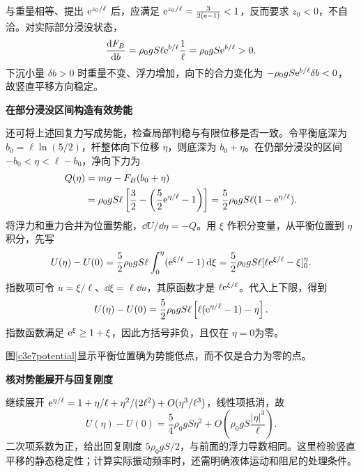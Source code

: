 \begin{solution}
与重量相等、提出 $\mathrm e^{z_0/\ell}$ 后，应满足
$\mathrm e^{z_0/\ell}=\tfrac{3}{2(\mathrm e-1)}<1$，反而要求 $z_0<0$，不自洽。对实际部分浸没状态，
\[
\frac{\mathop{}\!\mathrm d F_B}{\mathop{}\!\mathrm d b}
=\rho_0gS\ell\mathrm e^{b/\ell}\frac1\ell
=\rho_0gS\mathrm e^{b/\ell}>0.
\]
下沉小量 $\delta b>0$ 时重量不变、浮力增加，向下的合力变化为 $-\rho_0gS\mathrm e^{b/\ell}\delta b<0$，故竖直平移方向稳定。


\par\medskip{}\noindent\textbf{在部分浸没区间构造有效势能}\par\nobreak
还可将上述回复力写成势能，检查局部判稳与有限位移是否一致。令平衡底深为 $b_0=\ell\ln(5/2)$，杆整体向下位移 $\eta$，则底深为 $b_0+\eta$。在仍部分浸没的区间 $-b_0<\eta<\ell-b_0$，净向下力为
\begin{align*}
Q(\eta)&=mg-F_B(b_0+\eta)\\
 &=\rho_0gS\ell\left[\frac32-\left(\frac52\mathrm e^{\eta/\ell}-1\right)\right]
 =\frac52\rho_0gS\ell(1-\mathrm e^{\eta/\ell}).
\end{align*}
将浮力和重力合并为位置势能，$\dd U/\dd\eta=-Q$。用 $\xi$ 作积分变量，从平衡位置到 $\eta$ 积分，先写
\[
 U(\eta)-U(0)=\frac52\rho_0gS\ell
 \int_0^\eta(\mathrm e^{\xi/\ell}-1)\mathop{}\!\mathrm d\xi
 =\frac52\rho_0gS\ell[\ell\mathrm e^{\xi/\ell}-\xi]_0^\eta.
\]
指数项可令 $u=\xi/\ell$、$\dd\xi=\ell\dd u$，其原函数才是 $\ell\mathrm e^{\xi/\ell}$。代入上下限，得到
\[U(\eta)-U(0)=\frac52\rho_0gS\ell
 \left[\ell(\mathrm e^{\eta/\ell}-1)-\eta\right].\]
指数函数满足 $\mathrm e^\xi\ge1+\xi$，因此方括号非负，且仅在 $\eta=0$为零。

图\ref{c3e7potential}显示平衡位置确为势能低点，而不仅是合力为零的点。

\par\medskip{}\noindent\textbf{核对势能展开与回复刚度}\par\nobreak
继续展开 $\mathrm e^{\eta/\ell}=1+\eta/\ell+\eta^2/(2\ell^2)+O(\eta^3/\ell^3)$，线性项抵消，故
\[U(\eta)-U(0)=\frac54\rho_0gS\eta^2
 +O\!\left(\rho_0gS\frac{|\eta|^3}{\ell}\right).\]
二次项系数为正，给出回复刚度 $5\rho_0gS/2$，与前面的浮力导数相同。这里检验竖直平移的静态稳定性；计算实际振动频率时，还需明确液体运动和阻尼的处理条件。

\end{solution}

